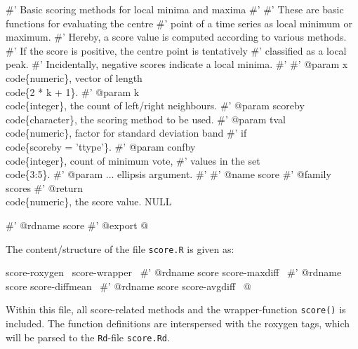 \documentclass[a4paper]{article}
\begin{document}
\nwenddocs{}\endmoddef
#' Basic scoring methods for local minima and maxima
#'
#' These are basic functions for evaluating the centre
#' point of a time series as local minimum or maximum.
#' Hereby, a score value is computed according to various methods.
#' If the score is positive, the centre point is tentatively
#' classified as a local peak.
#' Incidentally, negative scores indicate a local minima.
#'
#' @param x \\code\{numeric\}, vector of length \\code\{2 * k + 1\}.
#' @param k \\code\{integer\}, the count of left/right neighbours.
#' @param scoreby \\code\{character\}, the scoring method to be used.
#' @param tval \\code\{numeric\}, factor for standard deviation band
#' if \\code\{scoreby = 'ttype'\}.
#' @param confby \\code\{integer\}, count of minimum vote,
#' values in the set \\code\{3:5\}.
#' @param ... ellipsis argument.
#'
#' @name score
#' @family scores
#' @return \\code\{numeric\}, the score value.
NULL

#' @rdname score
#' @export
\nwendcode{}@

The content/structure of the file \texttt{score.R} is given as:

\nwenddocs{}\endmoddef\let\nwnotused=\nwoutput{}
\LA{}score-roxygen~{\nwtagstyle{}}\RA{}
\LA{}score-wrapper~{\nwtagstyle{}}\RA{}
#' @rdname score
\LA{}score-maxdiff~{\nwtagstyle{}}\RA{}
#' @rdname score
\LA{}score-diffmean~{\nwtagstyle{}}\RA{}
#' @rdname score
\LA{}score-avgdiff~{\nwtagstyle{}}\RA{}
\nwnotused{score.R}\nwendcode{}@

Within this file, all score-related methods and the wrapper-function
\texttt{score()} is included. The function definitions are
interspersed with the roxygen tags, which will be parsed to the
\texttt{Rd}-file \texttt{score.Rd}.
\end{document}
